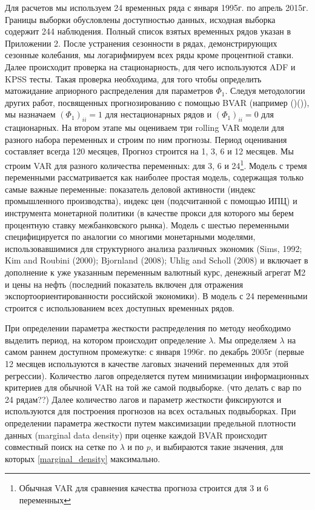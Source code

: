 \documentclass[11pt]{article} %
\begin{document}
Для расчетов мы используем 24 временных ряда с января 1995г. по апрель 2015г. Границы выборки обусловлены доступностью данных, исходная выборка содержит 244 наблюдения. Полный список взятых временных рядов указан в Приложении 2. После устранения сезонности в рядах, демонстрирующих сезонные колебания, мы логарифмируем всех ряды кроме процентной ставки. Далее происходит проверка на стационарность, для чего используются ADF и KPSS тесты. Такая проверка необходима, для того чтобы определить матожидание априорного  распределения для параметров $\Phi_1$. Следуя методологии других работ, посвященных прогнозированию с помощью BVAR (например ()()), мы назначаем $(\Phi_1)_{ii}=1$  для  нестационарных рядов и $(\Phi_1)_{ii}=0$ для стационарных. 
На втором этапе мы оцениваем три rolling VAR модели для разного набора переменных и строим по ним прогнозы. Период  оценивания составляет всегда 120 месяцев, Прогноз строится на 1, 3, 6 и 12 месяцев.  Мы строим VAR  для разного количества переменных: для 3, 6 и 24\footnote{Обычная VAR для сравнения качества прогноза строится для 3 и 6 переменных}. Модель с тремя переменными рассматривается как наиболее простая модель, содержащая только самые важные  переменные: показатель деловой активности (индекс промышленного производства),  индекс цен (подсчитанной с помощью ИПЦ) и  инструмента монетарной политики (в качестве прокси для которого мы берем процентную ставку межбанковского рынка). Модель с шестью переменными специфицируется по аналогии со многими монетарными моделями, использовавшимися для структурного анализа различных экономик (Sims, 1992; Kim and Roubini (2000); Bjornland (2008); Uhlig and Scholl (2008) и включает  в дополнение к уже указанным переменным валютный курс, денежный агрегат М2 и цены на нефть (последний показатель включен для отражения экспортоориентированности российской экономики). В модель с 24 переменными строится с использованием всех доступных временных рядов.




 
При определении параметра жесткости распределения по методу \cite{banbura_al_2010} необходимо выделить период, на котором происходит определение $\lambda$. Мы определяем $\lambda$ на самом раннем доступном промежутке: с января 1996г. по декабрь 2005г (первые 12 месяцев используются в качестве лаговых значений переменных для этой регрессии). Количество лагов определяется путем минимизации информационных критериев для обычной VAR на той же самой подвыборке. (что делать с вар по 24 рядам??) Далее количество лагов и параметр жесткости фиксируются и используются для построения прогнозов на всех остальных подвыборках. 
При определении параметра жесткости путем максимизации предельной плотности данных (marginal data density) при оценке каждой BVAR происходит совместный поиск на сетке по $\lambda$ и по $p$, и выбираются такие значения, для которых \eqref{marginal_density} максимально.  
\end{document}
